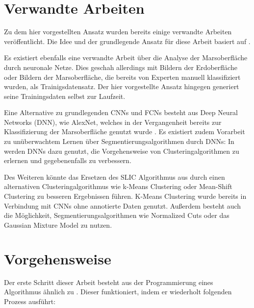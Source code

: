 \documentclass[a4paper,twocolumn,abstract,DIV=16]{scrartcl}
\begin{document}
\section{Verwandte Arbeiten}

Zu dem hier vorgestellten Ansatz wurden bereits einige verwandte Arbeiten veröffentlicht. Die Idee und der grundlegende Ansatz für diese Arbeit basiert auf \cite{kanezaki2018_unsupervised_segmentation}.

Es existiert ebenfalls eine verwandte Arbeit über die Analyse der Marsoberfläche durch neuronale Netze\cite{2016arXiv160100978C}. Dies geschah allerdings mit Bildern der Erdoberfläche oder Bildern der Marsoberfläche, die bereits von Experten manuell klassifiziert wurden, als Trainigsdatensatz. Der hier vorgestellte Ansatz hingegen generiert seine Trainingsdaten selbst zur Laufzeit.

Eine Alternative zu grundlegenden CNNs und FCNs besteht aus Deep Neural Networks (DNN), wie AlexNet\cite{NIPS2012_4824}, welches in der Vergangenheit bereits zur Klassifizierung der Marsoberfläche genutzt wurde \cite{Wagstaff2018DeepMC}. Es existiert zudem Vorarbeit zu unüberwachtem Lernen über Segmentierungsalgorithmen durch DNNs: In \cite{pmlr-v48-xieb16} werden DNNs dazu genutzt, die Vorgehensweise von Clusteringalgorithmen zu erlernen und gegebenenfalls zu verbessern.

Des Weiteren könnte das Ersetzen des SLIC Algorithmus aus \cite{kanezaki2018_unsupervised_segmentation} durch einen alternativen Clusteringalgorithmus wie k-Means Clustering oder Mean-Shift Clustering zu besseren Ergebnissen führen. K-Means Clustering wurde bereits in Verbindung mit CNNs ohne annotierte Daten genutzt\cite{2019arXiv190603359A}. Außerdem besteht auch die Möglichkeit, Segmentierungsalgorithmen wie Normalized Cuts\cite{shi2000normalized} oder das Gaussian Mixture Model\cite{8360143} zu nutzen.

\section{Vorgehensweise}
\label{sect:Vorgehensweise}

Der erste Schritt dieser Arbeit besteht aus der Programmierung eines Algorithmus ähnlich zu \cite{kanezaki2018_unsupervised_segmentation}. Dieser funktioniert, indem er wiederholt folgenden Prozess ausführt:
\end{document}
